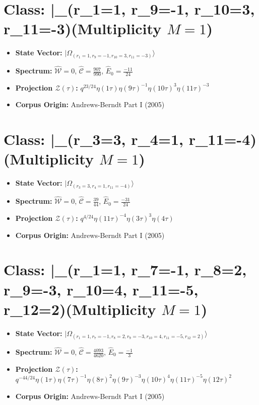 \documentclass[11pt,twoside,openright]{book}
\begin{document}
\section*{Class: |\Omega_{(r_{1}=1, r_{9}=-1, r_{10}=3, r_{11}=-3)}\rangle (Multiplicity $M=1$)}
\begin{itemize}
  \item \textbf{State Vector:} $|\Omega_{(r_{1}=1, r_{9}=-1, r_{10}=3, r_{11}=-3)}\rangle$
  \item \textbf{Spectrum:} $\hat{\mathcal{W}} = 0$, $\hat{\mathcal{C}} = \frac{907}{990}$, $\hat{E}_0 = \frac{-11}{24}$
  \item \textbf{Projection $\mathcal{Z}(\tau)$:} $q^{23/24} \eta(1\tau) \eta(9\tau)^{-1} \eta(10\tau)^{3} \eta(11\tau)^{-3}$
  \item \textbf{Corpus Origin:} Andrews-Berndt Part I (2005)
\end{itemize}

\section*{Class: |\Omega_{(r_{3}=3, r_{4}=1, r_{11}=-4)}\rangle (Multiplicity $M=1$)}
\begin{itemize}
  \item \textbf{State Vector:} $|\Omega_{(r_{3}=3, r_{4}=1, r_{11}=-4)}\rangle$
  \item \textbf{Spectrum:} $\hat{\mathcal{W}} = 0$, $\hat{\mathcal{C}} = \frac{39}{44}$, $\hat{E}_0 = \frac{-31}{24}$
  \item \textbf{Projection $\mathcal{Z}(\tau)$:} $q^{4/24} \eta(11\tau)^{-4} \eta(3\tau)^{3} \eta(4\tau)$
  \item \textbf{Corpus Origin:} Andrews-Berndt Part I (2005)
\end{itemize}

\section*{Class: |\Omega_{(r_{1}=1, r_{7}=-1, r_{8}=2, r_{9}=-3, r_{10}=4, r_{11}=-5, r_{12}=2)}\rangle (Multiplicity $M=1$)}
\begin{itemize}
  \item \textbf{State Vector:} $|\Omega_{(r_{1}=1, r_{7}=-1, r_{8}=2, r_{9}=-3, r_{10}=4, r_{11}=-5, r_{12}=2)}\rangle$
  \item \textbf{Spectrum:} $\hat{\mathcal{W}} = 0$, $\hat{\mathcal{C}} = \frac{4093}{4620}$, $\hat{E}_0 = \frac{-1}{3}$
  \item \textbf{Projection $\mathcal{Z}(\tau)$:} $q^{-44/24} \eta(1\tau) \eta(7\tau)^{-1} \eta(8\tau)^{2} \eta(9\tau)^{-3} \eta(10\tau)^{4} \eta(11\tau)^{-5} \eta(12\tau)^{2}$
  \item \textbf{Corpus Origin:} Andrews-Berndt Part I (2005)
\end{itemize}
\end{document}
